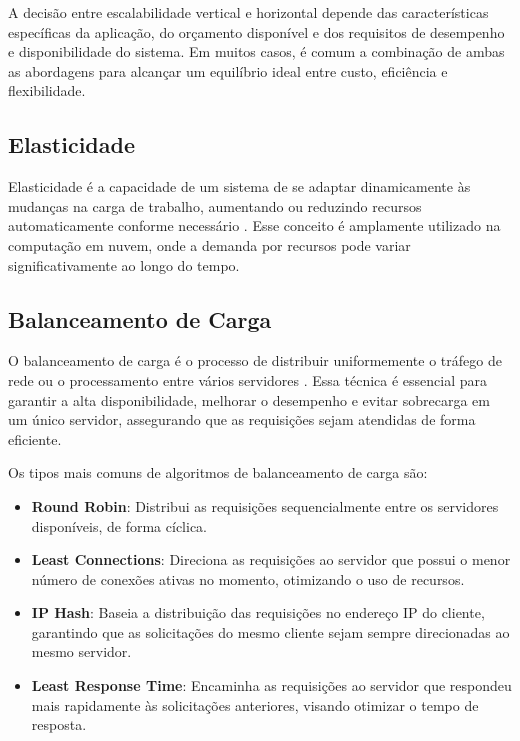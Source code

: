 A decisão entre escalabilidade vertical e horizontal depende das características específicas da aplicação, do orçamento disponível e dos requisitos de desempenho e disponibilidade do sistema. Em muitos casos, é comum a combinação de ambas as abordagens para alcançar um equilíbrio ideal entre custo, eficiência e flexibilidade.

\subsection{Elasticidade}

Elasticidade é a capacidade de um sistema de se adaptar dinamicamente às mudanças na carga de trabalho, aumentando ou reduzindo recursos automaticamente conforme necessário \cite{what-is-elasticity}. Esse conceito é amplamente utilizado na computação em nuvem, onde a demanda por recursos pode variar significativamente ao longo do tempo.

\subsection{Balanceamento de Carga}


O balanceamento de carga é o processo de distribuir uniformemente o tráfego de rede ou o processamento entre vários servidores \cite{what-is-load-balancing}. Essa técnica é essencial para garantir a alta disponibilidade, melhorar o desempenho e evitar sobrecarga em um único servidor, assegurando que as requisições sejam atendidas de forma eficiente.

Os tipos mais comuns de algoritmos de balanceamento de carga são:

\begin{itemize}
    \item \textbf{Round Robin}: Distribui as requisições sequencialmente entre os servidores disponíveis, de forma cíclica.
    \item \textbf{Least Connections}: Direciona as requisições ao servidor que possui o menor número de conexões ativas no momento, otimizando o uso de recursos.
    \item \textbf{IP Hash}: Baseia a distribuição das requisições no endereço IP do cliente, garantindo que as solicitações do mesmo cliente sejam sempre direcionadas ao mesmo servidor.
    \item \textbf{Least Response Time}: Encaminha as requisições ao servidor que respondeu mais rapidamente às solicitações anteriores, visando otimizar o tempo de resposta.
\end{itemize}

